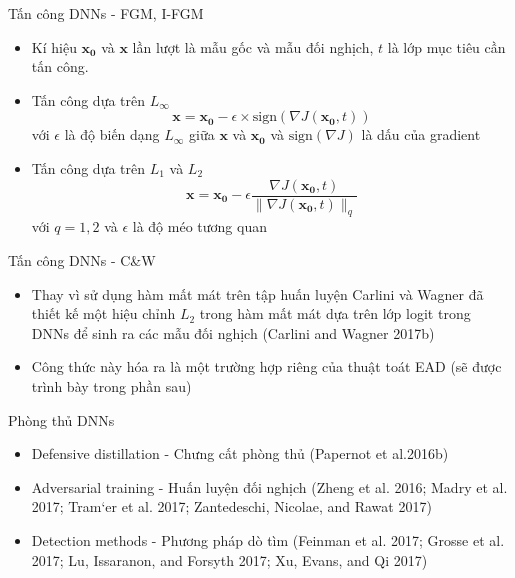 \begin{frame}{Tấn công DNNs - FGM, I-FGM}
    \begin{itemize}
        \item Kí hiệu $\mathbf{x_0}$ và $\mathbf{x}$ lần lượt là mẫu gốc và mẫu đối nghịch,
        $t$ là lớp mục tiêu cần tấn công.

        \item Tấn công dựa trên $L_{\infty}$
        \begin{equation}
            \mathbf{x} = \mathbf{x_0} - \epsilon \times \text{sign}(\nabla J(\mathbf{x_0}, t))
            \label{eq:1}
        \end{equation}
        với $\epsilon$ là độ biến dạng $L_{\infty}$ giữa $\mathbf{x}$ và $\mathbf{x_0}$ và 
        $\text{sign}(\nabla J)$ là dấu của gradient
        
        \item Tấn công dựa trên $L_1$ và $L_2$
        \begin{equation}
            \mathbf{x} = \mathbf{x_0} - \epsilon \frac{\nabla J(\mathbf{x_0}, t)}
            {\lVert \nabla J(\mathbf{x_0}, t) \rVert _q}
            \label{eq:2}
        \end{equation}
        với $q = 1,2$ và $\epsilon$ là độ méo tương quan
    \end{itemize}
\end{frame}

\begin{frame}{Tấn công DNNs - C\&W}
    \begin{itemize}
        \item Thay vì sử dụng hàm mất mát trên tập huấn luyện Carlini và Wagner
        đã thiết kế  một hiệu chỉnh $L_2$ trong hàm mất mát dựa trên lớp logit trong DNNs để sinh 
        ra các mẫu đối nghịch (Carlini and Wagner 2017b)
        \item Công thức này hóa ra là một trường hợp riêng của thuật toát EAD (sẽ được trình bày trong phần sau)
    \end{itemize}
\end{frame}

\begin{frame}{Phòng thủ DNNs}
    \begin{itemize}
        \item Defensive distillation - Chưng cất phòng thủ (Papernot et al.2016b)
        \item Adversarial training - Huấn luyện đối nghịch (Zheng et al. 2016; Madry et al. 2017; 
        Tram`er et al. 2017; Zantedeschi, Nicolae, and Rawat 2017)
        \item Detection methods - Phương pháp dò tìm (Feinman et al. 2017; Grosse et al. 2017; Lu, Issaranon, and Forsyth 2017; 
        Xu, Evans, and Qi 2017)
    \end{itemize}
\end{frame}